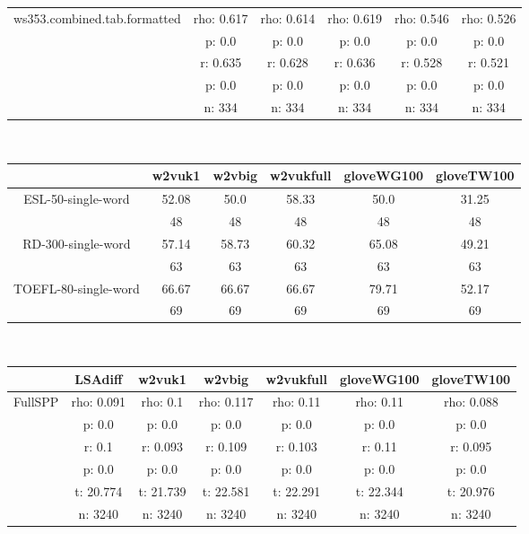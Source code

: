 \documentclass{article}
\begin{document}
\begin{tabular}{cccccc|}
\hline
\multicolumn{1}{|c|}{\multirow{5}{*}{ws353.combined.tab.formatted}} & rho: 0.617 & rho: 0.614 & rho: 0.619 & rho: 0.546 & rho: 0.526 \\
\multicolumn{1}{|c|}{} & p: 0.0 & p: 0.0 & p: 0.0 & p: 0.0 & p: 0.0 \\
\multicolumn{1}{|c|}{} & r: 0.635 & r: 0.628 & r: 0.636 & r: 0.528 & r: 0.521 \\
\multicolumn{1}{|c|}{} & p: 0.0 & p: 0.0 & p: 0.0 & p: 0.0 & p: 0.0 \\
\multicolumn{1}{|c|}{} & n: 334 & n: 334 & n: 334 & n: 334 & n: 334 \\
\hline
\end{tabular}\\
\begin{tabular}{cccccc|}\cline{2-6}
&\multicolumn{1}{|c}{w2vuk1} & w2vbig & w2vukfull & gloveWG100 & gloveTW100 \\\hline
\multicolumn{1}{|c|}{\multirow{2}{*}{ESL-50-single-word}} & 52.08 & 50.0 & 58.33 & 50.0 & 31.25 \\
\multicolumn{1}{|c|}{} & 48 & 48 & 48 & 48 & 48 \\
\hline
\multicolumn{1}{|c|}{\multirow{2}{*}{RD-300-single-word}} & 57.14 & 58.73 & 60.32 & 65.08 & 49.21 \\
\multicolumn{1}{|c|}{} & 63 & 63 & 63 & 63 & 63 \\
\hline
\multicolumn{1}{|c|}{\multirow{2}{*}{TOEFL-80-single-word}} & 66.67 & 66.67 & 66.67 & 79.71 & 52.17 \\
\multicolumn{1}{|c|}{} & 69 & 69 & 69 & 69 & 69 \\
\hline
\end{tabular}\\
\begin{tabular}{ccccccc|}\cline{2-7}
&\multicolumn{1}{|c}{LSAdiff} & w2vuk1 & w2vbig & w2vukfull & gloveWG100 & gloveTW100 \\\hline
\multicolumn{1}{|c|}{\multirow{6}{*}{FullSPP}} & rho: 0.091 & rho: 0.1 & rho: 0.117 & rho: 0.11 & rho: 0.11 & rho: 0.088 \\
\multicolumn{1}{|c|}{} & p: 0.0 & p: 0.0 & p: 0.0 & p: 0.0 & p: 0.0 & p: 0.0 \\
\multicolumn{1}{|c|}{} & r: 0.1 & r: 0.093 & r: 0.109 & r: 0.103 & r: 0.11 & r: 0.095 \\
\multicolumn{1}{|c|}{} & p: 0.0 & p: 0.0 & p: 0.0 & p: 0.0 & p: 0.0 & p: 0.0 \\
\multicolumn{1}{|c|}{} & t: 20.774 & t: 21.739 & t: 22.581 & t: 22.291 & t: 22.344 & t: 20.976 \\
\multicolumn{1}{|c|}{} & n: 3240 & n: 3240 & n: 3240 & n: 3240 & n: 3240 & n: 3240 \\
\hline
\end{tabular}\\
\end{document}
